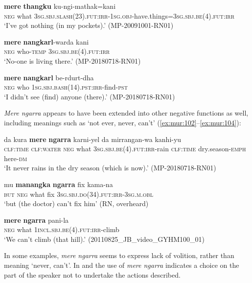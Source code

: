\documentclass[output=paper,colorlinks,citecolor=brown]{langscibook}
\begin{document}
\ea\label{ex:mur:99}
    \gll  \textbf{mere} \textbf{thangku} ku-ngi-mathak=kani\\
         \textsc{neg} what \textsc{3sg.sbj.slash(23).fut:irr-1sg.obj}{}-have.things=\textsc{3sg.sbj.be(4).fut:irr}\\
    \glt  ‘I’ve got nothing (in my pockets).’ (MP-20091001-RN01)
\z

\ea\label{ex:mur:100}
    \gll \textbf{mere} \textbf{nangkarl}-warda kani\\
         \textsc{neg} who{}-\textsc{temp} \textsc{3sg.sbj.be(4).fut:irr}\\
    \glt  ‘No-one is living there.’ (MP-20180718-RN01)
\z 

\ea\label{ex:mur:101}
    \gll \textbf{mere} \textbf{nangkarl} be-rdurt-dha\\
         \textsc{neg} who \textsc{1sg.sbj.bash(14).pst:irr}{}-find-\textsc{pst}\\
    \glt ‘I didn’t see (find) anyone (there).’ (MP-20180718-RN01)
\z 

\textit{Mere ngarra} appears to have been extended into other negative functions as well, including meanings such as ‘not ever, never, can’t’ (\ref{ex:mur:102}--\ref{ex:mur:104}):

\ea\label{ex:mur:102}
    \gll da kura \textbf{mere} \textbf{ngarra} karni-yel da mirrangan-wa kanhi-yu\\
         \textsc{clf:time} \textsc{clf:water} \textsc{neg} what \textsc{3sg.sbj.be(4).fut:irr}{}-rain \textsc{clf:time} dry.season-\textsc{emph} here-\textsc{dm} \\
    \glt ‘It never rains in the dry season (which is now).’ (MP-20180718-RN01)
\z 

\ea\label{ex:mur:103} %
    \gll mu \textbf{manangka} \textbf{ngarra} fix kama-na\\
         \textsc{but} \textsc{neg} what fix \textsc{3sg.sbj.do(34).fut:irr-3sg.m.obl}\\
    \glt ‘but (the doctor) can’t fix him’ (RN, overheard)
\z 

\ea\label{ex:mur:104}
    \gll \textbf{mere} \textbf{ngarra} pani-la\\
         \textsc{neg} what \textsc{1incl.sbj.be(4).fut:irr}{}-climb\\
    \glt ‘We can’t climb (that hill).’ (20110825\_JB\_video\_GYHM100\_01)
\z 


In some examples, \textit{mere ngarra} seems to express lack of volition, rather than meaning ‘never, can’t’. In  and  the use of \textit{mere ngarra} indicates a choice on the part of the speaker not to undertake the actions described.
\end{document}
